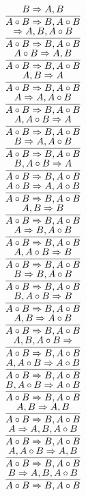 \documentclass[11pt]{article}
\begin{document}
\begin{center}
\bigskip
\\$\infer{A\circ B\Rightarrow B, A\circ B}{B\Rightarrow A, B}$
\bigskip
\\$\infer{A\circ B\Rightarrow B, A\circ B}{\Rightarrow A, B, A\circ B}$
\bigskip
\\$\infer{A\circ B\Rightarrow B, A\circ B}{A\circ B\Rightarrow A, B}$
\bigskip
\\$\infer{A\circ B\Rightarrow B, A\circ B}{A, B\Rightarrow A}$
\bigskip
\\$\infer{A\circ B\Rightarrow B, A\circ B}{A\Rightarrow A, A\circ B}$
\bigskip
\\$\infer{A\circ B\Rightarrow B, A\circ B}{A, A\circ B\Rightarrow A}$
\bigskip
\\$\infer{A\circ B\Rightarrow B, A\circ B}{B\Rightarrow A, A\circ B}$
\bigskip
\\$\infer{A\circ B\Rightarrow B, A\circ B}{B, A\circ B\Rightarrow A}$
\bigskip
\\$\infer{A\circ B\Rightarrow B, A\circ B}{A\circ B\Rightarrow A, A\circ B}$
\bigskip
\\$\infer{A\circ B\Rightarrow B, A\circ B}{A, B\Rightarrow B}$
\bigskip
\\$\infer{A\circ B\Rightarrow B, A\circ B}{A\Rightarrow B, A\circ B}$
\bigskip
\\$\infer{A\circ B\Rightarrow B, A\circ B}{A, A\circ B\Rightarrow B}$
\bigskip
\\$\infer{A\circ B\Rightarrow B, A\circ B}{B\Rightarrow B, A\circ B}$
\bigskip
\\$\infer{A\circ B\Rightarrow B, A\circ B}{B, A\circ B\Rightarrow B}$
\bigskip
\\$\infer{A\circ B\Rightarrow B, A\circ B}{A, B\Rightarrow A\circ B}$
\bigskip
\\$\infer{A\circ B\Rightarrow B, A\circ B}{A, B, A\circ B\Rightarrow }$
\bigskip
\\$\infer{A\circ B\Rightarrow B, A\circ B}{A, A\circ B\Rightarrow A\circ B}$
\bigskip
\\$\infer{A\circ B\Rightarrow B, A\circ B}{B, A\circ B\Rightarrow A\circ B}$
\bigskip
\\$\infer{A\circ B\Rightarrow B, A\circ B}{A, B\Rightarrow A, B}$
\bigskip
\\$\infer{A\circ B\Rightarrow B, A\circ B}{A\Rightarrow A, B, A\circ B}$
\bigskip
\\$\infer{A\circ B\Rightarrow B, A\circ B}{A, A\circ B\Rightarrow A, B}$
\bigskip
\\$\infer{A\circ B\Rightarrow B, A\circ B}{B\Rightarrow A, B, A\circ B}$

\end{center}
\end{document}

